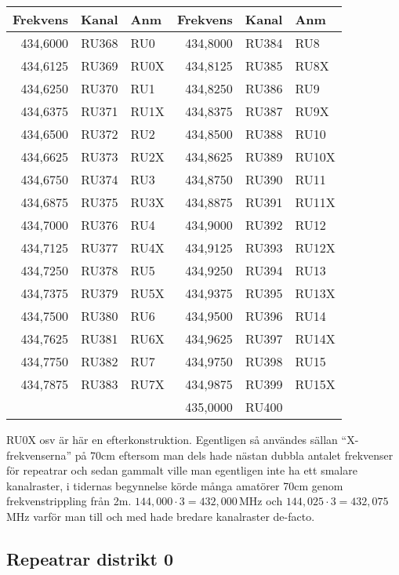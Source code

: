 \begin{longtable}{rrl|rrl}
\textbf{Frekvens} & \textbf{Kanal} & \textbf{Anm}
&  \textbf{Frekvens} & \textbf{Kanal} & \textbf{Anm} \\ \hline

434,6000 & RU368 & RU0  & 434,8000 & RU384 & RU8   \\
434,6125 & RU369 & RU0X & 434,8125 & RU385 & RU8X  \\
434,6250 & RU370 & RU1  & 434,8250 & RU386 & RU9   \\
434,6375 & RU371 & RU1X & 434,8375 & RU387 & RU9X  \\
434,6500 & RU372 & RU2  & 434,8500 & RU388 & RU10  \\
434,6625 & RU373 & RU2X & 434,8625 & RU389 & RU10X \\
434,6750 & RU374 & RU3  & 434,8750 & RU390 & RU11  \\
434,6875 & RU375 & RU3X & 434,8875 & RU391 & RU11X \\
434,7000 & RU376 & RU4  & 434,9000 & RU392 & RU12  \\
434,7125 & RU377 & RU4X & 434,9125 & RU393 & RU12X \\
434,7250 & RU378 & RU5  & 434,9250 & RU394 & RU13  \\
434,7375 & RU379 & RU5X & 434,9375 & RU395 & RU13X \\
434,7500 & RU380 & RU6  & 434,9500 & RU396 & RU14  \\
434,7625 & RU381 & RU6X & 434,9625 & RU397 & RU14X \\
434,7750 & RU382 & RU7  & 434,9750 & RU398 & RU15  \\
434,7875 & RU383 & RU7X & 434,9875 & RU399 & RU15X \\
         &       &      & 435,0000 & RU400 &       \\

\end{longtable}

RU0X osv är här en efterkonstruktion. Egentligen så användes sällan
``X-frekvenserna'' på 70cm eftersom man dels hade nästan dubbla
antalet frekvenser för repeatrar och sedan gammalt ville man
egentligen inte ha ett smalare kanalraster, i tidernas begynnelse
körde många amatörer 70cm genom frekvenstrippling från 2m. $144,000
\cdot 3 = 432,000$\,MHz och $144,025 \cdot 3 = 432,075$\,MHz varför
man till och med hade bredare kanalraster de-facto.

\clearpage

\subsection{Repeatrar distrikt 0}

